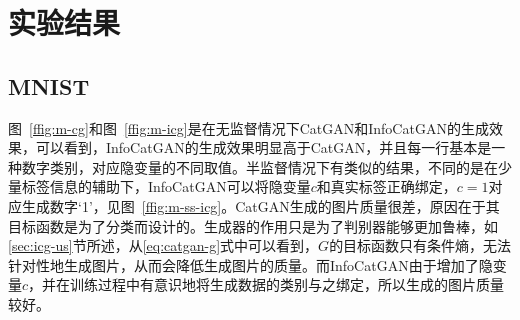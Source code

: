 \section{实验结果}\label{sec:results}

\subsection{MNIST}\label{sec:icg-ex}

图~\ref{ffig:m-cg}和图~\ref{ffig:m-icg}是在无监督情况下CatGAN和InfoCatGAN的生成效果，可以看到，InfoCatGAN的生成效果明显高于CatGAN，并且每一行基本是一种数字类别，对应隐变量的不同取值。半监督情况下有类似的结果，不同的是在少量标签信息的辅助下，InfoCatGAN可以将隐变量$c$和真实标签正确绑定，$c=1$对应生成数字`1'，见图~\ref{ffig:m-ss-icg}。CatGAN生成的图片质量很差，原因在于其目标函数是为了分类而设计的。生成器的作用只是为了判别器能够更加鲁棒，如\ref{sec:icg-us}节所述，从\eqref{eq:catgan-g}式中可以看到，$G$的目标函数只有条件熵，无法针对性地生成图片，从而会降低生成图片的质量。而InfoCatGAN由于增加了隐变量$c$，并在训练过程中有意识地将生成数据的类别与之绑定，所以生成的图片质量较好。

